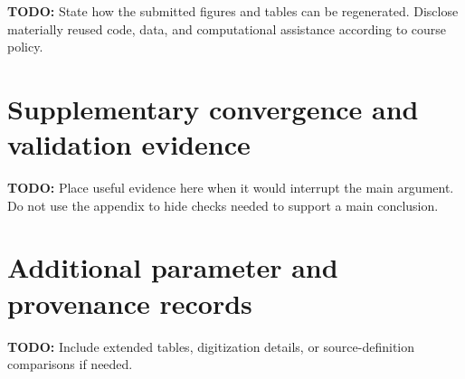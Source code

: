 \documentclass[11pt,a4paper]{article}
\newcommand{\todo}[1]{\textcolor{BrickRed}{\textbf{TODO:} #1}}
\begin{document}
\todo{State how the submitted figures and tables can be regenerated. Disclose
materially reused code, data, and computational assistance according to course
policy.}

\clearpage



\appendix
\section{Supplementary convergence and validation evidence}

\todo{Place useful evidence here when it would interrupt the main argument.
Do not use the appendix to hide checks needed to support a main conclusion.}

\section{Additional parameter and provenance records}

\todo{Include extended tables, digitization details, or source-definition
comparisons if needed.}
\end{document}

